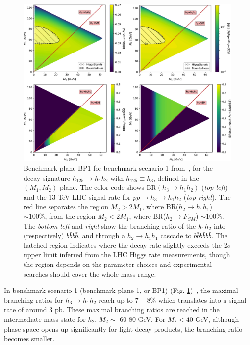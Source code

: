 \begin{figure}[ht]
    \centering
    \includegraphics[width=15cm]{figures/ch-1-introduction/Robens-TRSM-Figure-6-BP-1.png}
    \caption[Benchmark plane BP1 for benchmark scenario 1, for the decay signature $h_{125} \rightarrow h_1 h_2$ with $h_{125} \equiv h_3$, defined in the $(M_1, M_2)$ plane.]{Benchmark plane BP1 for benchmark scenario 1 from~\cite{Robens:2019kga}, for the decay signature $h_{125} \rightarrow h_1 h_2$ with $h_{125} \equiv h_3$, defined in the $(M_1, M_2)$ plane. The color code shows BR$(h_3 \rightarrow h_1 h_2)$ (\textit{top left}) and the 13 TeV LHC signal rate for $pp \rightarrow h_3 \rightarrow h_1 h_2$ (\textit{top right}). The red line separates the region $M_2 > 2 M_1$, where BR($h_2 \rightarrow h_1 h_1$) $\sim 100\%$, from the region $M_2 < 2 M_1$, where BR($h_2 \rightarrow F_{SM}$) $\sim 100\%$. The \textit{bottom left} and \textit{right} show the branching ratio of the $h_1 h_2$ into (respectively) $b\bar{b}b\bar{b}$, and through a $h_2 \rightarrow h_1 h_1$ cascade to $b\bar{b}b\bar{b}b\bar{b}$. The hatched region indicates where the decay rate slightly exceeds the $2\sigma$ upper limit inferred from the LHC Higgs rate measurements, though the region depends on the parameter choices and experimental searches should cover the whole mass range.}
    \label{fig:trsm_bp1}
\end{figure}

In benchmark scenario 1 (benchmark plane 1, or BP1) (Fig. \ref{fig:trsm_bp1})~\cite{Robens:2019kga}, the maximal branching ratios for $h_3 \rightarrow h_1 h_2$ reach up to $7-8\%$ which translates into a signal rate of around 3 pb. These maximal branching ratios are reached in the intermediate mass state for $h_2$, $M_2 \sim$ 60-80 GeV. For $M_2 < 40$ GeV, although phase space opens up significantly for light decay products, the branching ratio becomes smaller. 

